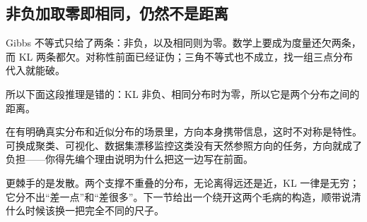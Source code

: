 \subsection{非负加取零即相同，仍然不是距离}

Gibbs 不等式只给了两条：非负，以及相同则为零。数学上要成为度量还欠两条，而 KL 两条都欠。对称性前面已经证伪；三角不等式也不成立，找一组三点分布代入就能破。

所以下面这段推理是错的：KL 非负、相同分布时为零，所以它是两个分布之间的距离。

在有明确真实分布和近似分布的场景里，方向本身携带信息，这时不对称是特性。可换成聚类、可视化、数据集漂移监控这类没有天然参照方向的任务，方向就成了负担——你得先编个理由说明为什么把这一边写在前面。

更棘手的是发散。两个支撑不重叠的分布，无论离得远还是近，KL 一律是无穷；它分不出``差一点''和``差很多''。下一节给出一个绕开这两个毛病的构造，顺带说清什么时候该换一把完全不同的尺子。
